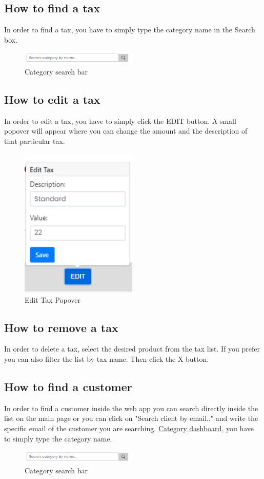 \subsection{How to find a tax}\label{_findTax}
In order to find a tax, you have to simply type the category name in the Search box.
\begin{figure}[H]
    \centering
    \includegraphics[width=15em]{res/images/venditore/categorysearchbar.png}
    \caption{Category search bar}
\end{figure}

\subsection{How to edit a tax}\label{_editTax}
In order to edit a tax, you have to simply click the EDIT button.
A small popover will appear where you can change the amount and the description of that particular tax.
\begin{figure}[H]    
    \centering
    \includegraphics[width=15em]{res/images/venditore/edittax.png}
    \caption{Edit Tax Popover}
\end{figure}

\subsection{How to remove a tax}\label{_removeTax}
In order to delete a tax, select the desired product from the tax list. If you prefer you can also filter the list by tax name. Then click the X button.

\subsection{How to find a customer}\label{_findCustomer}
In order to find a customer inside the web app you can search directly inside the list on the main page or you can click on "Search client by email.." and write the specific email of the customer you are searching. \hyperref[_categorymanagement]{Category dashboard}, you have to simply type the category name.
\begin{figure}[H]
    \centering
    \includegraphics[width=15em]{res/images/venditore/categorysearchbar.png}
    \caption{Category search bar}
\end{figure}

